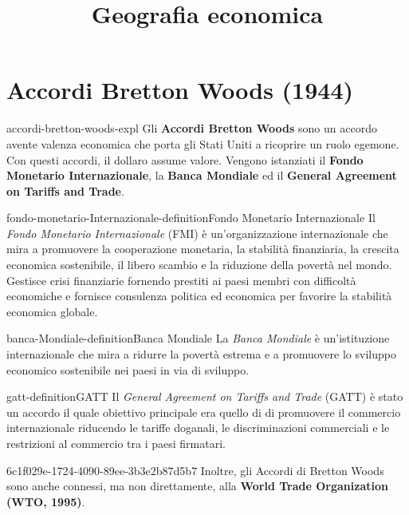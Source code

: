 \documentclass[preview]{standalone}
\begin{document}
\title{Geografia economica}
\genpage

\section{Accordi Bretton Woods (1944)}

\begin{snippet}{accordi-bretton-woods-expl}
    Gli \textbf{Accordi Bretton Woods} sono un accordo avente valenza economica
    che porta gli Stati Uniti a ricoprire un ruolo egemone. Con questi accordi, il
    dollaro assume valore. Vengono istanziati il \textbf{Fondo Monetario Internazionale},
    la \textbf{Banca Mondiale} ed il \textbf{General Agreement on Tariffs and Trade}.
\end{snippet}

\begin{snippetdefinition}{fondo-monetario-Internazionale-definition}{Fondo Monetario Internazionale}
    Il \textit{Fondo Monetario Internazionale} (FMI) è un'organizzazione internazionale che mira a promuovere
    la cooperazione monetaria, la stabilità finanziaria,
    la crescita economica sostenibile, il libero scambio e la riduzione della povertà nel mondo.
    Gestisce crisi finanziarie fornendo prestiti ai paesi membri con difficoltà economiche e
    fornisce consulenza politica ed economica per favorire la stabilità economica globale.
\end{snippetdefinition}

\begin{snippetdefinition}{banca-Mondiale-definition}{Banca Mondiale}
    La \textit{Banca Mondiale} è un'istituzione internazionale che mira a ridurre la povertà
    estrema e a promuovere lo sviluppo economico sostenibile nei paesi in via di sviluppo.
\end{snippetdefinition}

\begin{snippetdefinition}{gatt-definition}{GATT}
    Il \textit{General Agreement on Tariffs and Trade} (GATT)
    è stato un accordo il quale obiettivo principale era quello di
    di promuovere il commercio internazionale riducendo le tariffe doganali,
    le discriminazioni commerciali e le restrizioni al commercio tra i paesi firmatari. 
\end{snippetdefinition}

\begin{snippet}{6c1f029e-1724-4090-89ee-3b3e2b87d5b7}
    Inoltre, gli Accordi di Bretton Woods sono anche connessi, ma non direttamente,
    alla \textbf{World Trade Organization (WTO, 1995)}.
\end{snippet}
\end{document}
